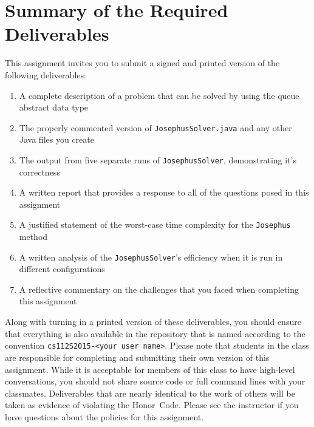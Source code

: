 \section*{Summary of the Required Deliverables}

  This assignment invites you to submit a signed and printed version of the following deliverables:

  \begin{enumerate}

  \item A complete description of a problem that can be solved by using the queue abstract data type

  \item The properly commented version of {\tt JosephusSolver.java} and any other Java files you create

  \item The output from five separate runs of {\tt JosephusSolver}, demonstrating it's correctness

  \item A written report that provides a response to all of the questions posed in this assignment

  \item A justified statement of the worst-case time complexity for the {\tt Josephus} method

  \item A written analysis of the {\tt JosephusSolver}'s efficiency when it is run in different configurations

  \item A reflective commentary on the challenges that you faced when completing this assignment

  \end{enumerate}

  Along with turning in a printed version of these deliverables, you should ensure that everything is also available in
  the repository that is named according to the convention {\tt cs112S2015-<your user name>}. Please note that students
  in the class are responsible for completing and submitting their own version of this assignment.    While it is
  acceptable for members of this class to have high-level conversations, you should not share source code or full
  command lines with your classmates.  Deliverables that are nearly identical to the work of others will be taken as
  evidence of violating the \mbox{Honor Code}.  Please see the instructor if you have questions about the policies for
  this assignment.

  
